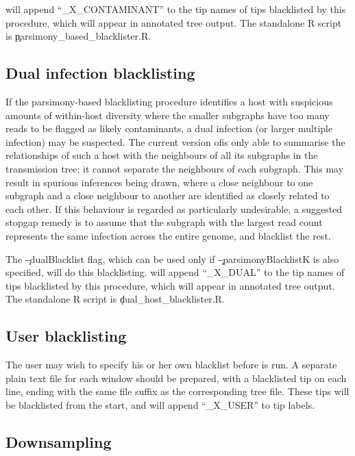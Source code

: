 \pat will append ``\_X\_CONTAMINANT'' to the tip names of tips blacklisted by this procedure, which will appear in annotated tree output.
The standalone R script is \c{parsimony\_based\_blacklister.R}.

\subsection{Dual infection blacklisting}

If the parsimony-based blacklisting procedure identifies a host with suspicious amounts of within-host diversity where the smaller subgraphs have too many reads to be flagged as likely contaminants, a dual infection (or larger multiple infection) may be suspected.
The current version of\break \pat is only able to summarise the relationships of such a host with the neighbours of all its subgraphs in the transmission tree; it cannot separate the neighbours of each subgraph.
This may result in spurious inferences being drawn, where a close neighbour to one subgraph and a close neighbour to another are identified as closely related to each other.
If this behaviour is regarded as particularly undesirable, a suggested stopgap remedy is to assume that the subgraph with the largest read count represents the same infection across the entire genome, and blacklist the rest.

The \c{--dualBlacklist} flag, which can be used only if \c{--parsimonyBlacklistK} is also specified, will do this blacklisting.
\pat will append ``\_X\_DUAL'' to the tip names of tips blacklisted by this procedure, which will appear in annotated tree output.
 The standalone R script is \c{dual\_host\_blacklister.R}.

\subsection{User blacklisting} \label{sec:UserBlacklisting}

The user may wish to specify his or her own blacklist before \pat is run.
A separate plain text file for each window should be prepared, with a blacklisted tip on each line, ending with the same file suffix as the corresponding tree file.
These tips will be blacklisted from the start, and \pat will append ``\_X\_USER'' to tip labels.

\subsection{Downsampling}

